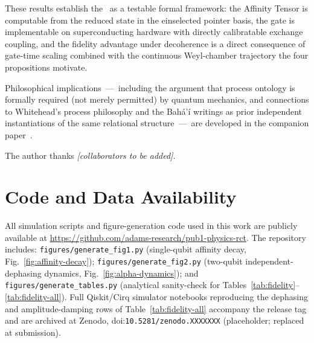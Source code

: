 These results establish the \RCT~as a testable formal framework: the
Affinity Tensor is computable from the reduced state in the einselected
pointer basis, the gate is implementable on superconducting hardware
with directly calibratable exchange coupling, and the fidelity advantage
under decoherence is a direct consequence of gate-time scaling combined
with the continuous Weyl-chamber trajectory the four propositions
motivate.

Philosophical implications~---~including the argument that process
ontology is formally required (not merely permitted) by quantum
mechanics, and connections to Whitehead's process philosophy and the
Bah\'{a}'\'{i} writings as prior independent instantiations of the
same relational structure~---~are developed in the companion
paper~\cite{Adams2026Philosophy}.

\begin{acknowledgments}
The author thanks \emph{[collaborators to be added]}.
\end{acknowledgments}

\section*{Code and Data Availability}

All simulation scripts and figure-generation code used in this work are
publicly available at
\url{https://github.com/adams-research/pub1-physics-rct}.
The repository includes:
\texttt{figures/generate\_fig1.py} (single-qubit affinity decay,
Fig.~\ref{fig:affinity-decay});
\texttt{figures/generate\_fig2.py} (two-qubit independent-dephasing
dynamics, Fig.~\ref{fig:alpha-dynamics});
and \texttt{figures/generate\_tables.py} (analytical sanity-check for
Tables~\ref{tab:fidelity}--\ref{tab:fidelity-all}).
Full Qiskit/Cirq simulator notebooks reproducing the dephasing and
amplitude-damping rows of Table~\ref{tab:fidelity-all} accompany the
release tag and are archived at Zenodo,
doi:\texttt{10.5281/zenodo.XXXXXXX} (placeholder; replaced at submission).
